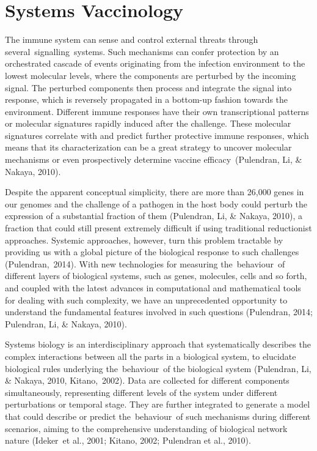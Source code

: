 \documentclass[
]{book}
\begin{document}
\hypertarget{systems-vaccinology}{%
\section{Systems Vaccinology}\label{systems-vaccinology}}

The immune system can sense and control external threats through several~signalling~systems. Such mechanisms can confer protection by an orchestrated cascade of events originating from the infection environment to the lowest molecular levels, where the components are perturbed by the incoming signal. The perturbed components then process and integrate the signal into response, which is reversely propagated in a bottom-up fashion towards the environment. Different immune responses have their own transcriptional patterns or molecular signatures rapidly induced after the challenge. These molecular signatures correlate with and predict further protective immune responses, which means that its characterization can be a great strategy to uncover molecular mechanisms or even prospectively determine vaccine efficacy~(Pulendran, Li, \& Nakaya, 2010)⁠.

Despite the apparent conceptual simplicity, there are more than 26,000 genes in our genomes and the challenge of a pathogen in the host body could perturb the expression of a substantial fraction of them (Pulendran, Li, \& Nakaya, 2010)⁠, a fraction that could still present extremely difficult if using traditional reductionist approaches. Systemic approaches, however, turn this problem tractable by providing us with a global picture of the biological response to such challenges (Pulendran,~2014)⁠. With new technologies for measuring the~behaviour~of different layers of biological systems, such as genes, molecules, cells and so forth, and coupled with the latest advances in computational and mathematical tools for dealing with such complexity, we have an unprecedented opportunity to understand the fundamental features involved in such questions (Pulendran, 2014; Pulendran, Li, \& Nakaya, 2010)⁠.

Systems biology is an interdisciplinary approach that systematically describes the complex interactions between all the parts in a biological system, to elucidate biological rules underlying the~behaviour~of the biological system (Pulendran, Li, \& Nakaya, 2010, Kitano,~2002)⁠⁠. Data are collected for different components simultaneously, representing different levels of the system under different perturbations or temporal stage. They are further integrated to generate a model that could describe or predict the~behaviour~of such mechanisms during different scenarios, aiming to the comprehensive understanding of biological network nature (Ideker~et al., 2001; Kitano, 2002; Pulendran et al., 2010).
\end{document}
